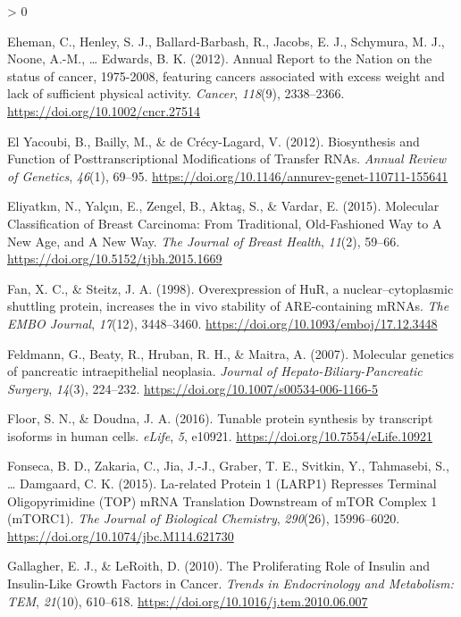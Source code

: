 \documentclass[
  12pt,
  openany]{book}
\newlength{\cslhangindent}
\newenvironment{CSLReferences}[2] %
 {%
  \setlength{\parindent}{0pt}
  \ifodd #1 \everypar{\setlength{\hangindent}{\cslhangindent}}\ignorespaces\fi
  \ifnum #2 > 0
  \setlength{\parskip}{#2\baselineskip}
  \fi
 }%
 {}
\begin{document}
\begin{CSLReferences}{1}{0}
\leavevmode\hypertarget{ref-Eheman2012}{}%
Eheman, C., Henley, S. J., Ballard-Barbash, R., Jacobs, E. J., Schymura, M. J., Noone, A.-M., \ldots{} Edwards, B. K. (2012). Annual {Report} to the {Nation} on the status of cancer, 1975-2008, featuring cancers associated with excess weight and lack of sufficient physical activity. \emph{Cancer}, \emph{118}(9), 2338--2366. \url{https://doi.org/10.1002/cncr.27514}

\leavevmode\hypertarget{ref-ElYacoubi2012}{}%
El Yacoubi, B., Bailly, M., \& de Crécy-Lagard, V. (2012). Biosynthesis and {Function} of {Posttranscriptional Modifications} of {Transfer RNAs}. \emph{Annual Review of Genetics}, \emph{46}(1), 69--95. \url{https://doi.org/10.1146/annurev-genet-110711-155641}

\leavevmode\hypertarget{ref-Eliyatkin2015}{}%
Eliyatkın, N., Yalçın, E., Zengel, B., Aktaş, S., \& Vardar, E. (2015). Molecular {Classification} of {Breast Carcinoma}: {From Traditional}, {Old}-{Fashioned Way} to {A New Age}, and {A New Way}. \emph{The Journal of Breast Health}, \emph{11}(2), 59--66. \url{https://doi.org/10.5152/tjbh.2015.1669}

\leavevmode\hypertarget{ref-Fan1998}{}%
Fan, X. C., \& Steitz, J. A. (1998). Overexpression of {HuR}, a nuclear--cytoplasmic shuttling protein, increases the in vivo stability of {ARE}-containing {mRNAs}. \emph{The EMBO Journal}, \emph{17}(12), 3448--3460. \url{https://doi.org/10.1093/emboj/17.12.3448}

\leavevmode\hypertarget{ref-Feldmann2007}{}%
Feldmann, G., Beaty, R., Hruban, R. H., \& Maitra, A. (2007). Molecular genetics of pancreatic intraepithelial neoplasia. \emph{Journal of Hepato-Biliary-Pancreatic Surgery}, \emph{14}(3), 224--232. \url{https://doi.org/10.1007/s00534-006-1166-5}

\leavevmode\hypertarget{ref-Floor2016}{}%
Floor, S. N., \& Doudna, J. A. (2016). Tunable protein synthesis by transcript isoforms in human cells. \emph{eLife}, \emph{5}, e10921. \url{https://doi.org/10.7554/eLife.10921}

\leavevmode\hypertarget{ref-Fonseca2015}{}%
Fonseca, B. D., Zakaria, C., Jia, J.-J., Graber, T. E., Svitkin, Y., Tahmasebi, S., \ldots{} Damgaard, C. K. (2015). La-related {Protein} 1 ({LARP1}) {Represses Terminal Oligopyrimidine} ({TOP}) {mRNA Translation Downstream} of {mTOR Complex} 1 ({mTORC1}). \emph{The Journal of Biological Chemistry}, \emph{290}(26), 15996--6020. \url{https://doi.org/10.1074/jbc.M114.621730}

\leavevmode\hypertarget{ref-Gallagher2010}{}%
Gallagher, E. J., \& LeRoith, D. (2010). The {Proliferating Role} of {Insulin} and {Insulin}-{Like Growth Factors} in {Cancer}. \emph{Trends in Endocrinology and Metabolism: TEM}, \emph{21}(10), 610--618. \url{https://doi.org/10.1016/j.tem.2010.06.007}


\end{CSLReferences}
\end{document}
